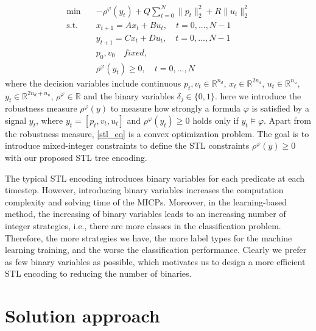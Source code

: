 \documentclass[a4paper]{report}
\begin{document}
\begin{equation}
    \label{stl_eq}%
    \begin{aligned}
        \min \quad       &  -\rho^\varphi (y_t) +  Q\sum_{t=0}^{N}  \| p_{t} \|_2^2 + R\|u_{t}\|_{2}^2 \\
        \text{s.t.}\quad &
        x_{t+1}=Ax_{t}+Bu_{t},  \quad t=0,...,N-1                                                                          \\
                         &
        y_{t+1}=Cx_t+Du_t,  \quad t=0,...,N-1 
                                                            \\
                         & p_0, v_0 \quad  fixed,                                   \\
                         & \rho^\varphi (y_t) \geq 0, \quad t=0,...,N 
    \end{aligned}
\end{equation}
where the decision variables include continuous $p_t, v_t \in \mathbb{R}^{n_d}$, $x_t \in \mathbb{R}^{2n_d}$, $u_t \in \mathbb{R}^{n_u}$, $y_t \in\mathbb{R}^{2n_d+n_u}$, $\rho^\varphi \in \mathbb{R}$ and the binary variables $\delta_j \in \{0,1\}$.
here we introduce the robustness measure $\rho^\varphi(y)$ to measure how strongly a formula $\varphi$ is satisfied by a signal $y_t$, where $y_t = [p_t,v_t,u_t]$ and $\rho^\varphi (y_t) \geq 0 $ holds only if $y_t \models  \varphi$. 
Apart from the robustness measure, \ref{stl_eq} is a convex optimization problem. The goal is to introduce mixed-integer constraints to define the STL constraints $\rho^\varphi(y) \geq 0$ with our proposed STL tree encoding. 

The typical STL encoding introduces binary variables for each predicate at each timestep. However, introducing binary variables increases the computation complexity and solving time of the MICPs. Moreover, in the learning-based method, the increasing of binary variables leads to an increasing number of integer strategies, i.e., there are more classes in the classification problem. Therefore, the more strategies we have, the more label types for the machine learning training, and the worse the classification performance. Clearly we prefer as few binary variables as possible, which motivates us to design a more efficient STL encoding to reducing the number of binaries.


\chapter{Solution approach}
\end{document}
